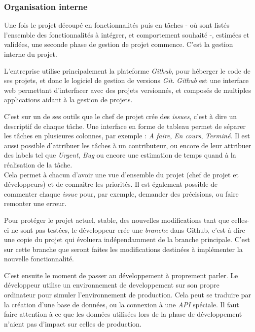 \bigskip

\subsubsection{Organisation interne}\label{organisation-interne}

\bigskip

Une fois le projet découpé en fonctionnalités puis en tâches - où sont
listés l'ensemble des fonctionnalités à intégrer, et comportement
souhaité -, estimées et validées, une seconde phase de gestion de projet
commence. C'est la gestion interne du projet.

L'entreprise utilise principalement la plateforme \emph{Github}, pour
héberger le code de ses projets, et donc le logiciel de gestion de
versions \emph{Git}. \emph{Github} est une interface web permettant
d'interfacer avec des projets versionnés, et composés de multiples
applications aidant à la gestion de projets.

\bigskip

C'est sur un de ses outils que le chef de projet crée des \emph{issues},
c'est à dire un descriptif de chaque tâche. Une interface en forme de
tableau permet de séparer les tâches en plusieures colonnes, par exemple
: \emph{A faire}, \emph{En cours}, \emph{Terminé}. Il est aussi possible
d'attribuer les tâches à un contributeur, ou encore de leur attribuer
des labels tel que \emph{Urgent}, \emph{Bug} ou encore une estimation de
temps quand à la réalisation de la tâche.\\
Cela permet à chacun d'avoir une vue d'ensemble du projet (chef de
projet et développeurs) et de connaitre les priorités. Il est également
possible de commenter chaque \emph{issue} pour, par exemple, demander
des précisions, ou faire remonter une erreur.

\bigskip

Pour protéger le projet actuel, stable, des nouvelles modifications tant
que celles-ci ne sont pas testées, le développeur crée une
\emph{branche} dans Github, c'est à dire une copie du projet qui
évoluera indépendamment de la branche principale. C'est sur cette
branche que seront faites les modifications destinées à implémenter la
nouvelle fonctionnalité.

\bigskip

C'est ensuite le moment de passer au développement à proprement parler.
Le développeur utilise un environnement de developpement sur son propre
ordinateur pour simuler l'environnement de production. Cela peut se
traduire par la création d'une base de données, ou la connexion à une
\emph{API} spéciale. Il faut faire attention à ce que les données
utilisées lors de la phase de développement n'aient pas d'impact sur
celles de production.

